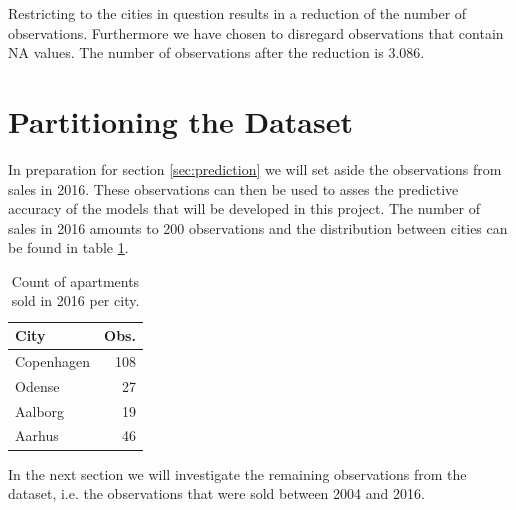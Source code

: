 Restricting to the cities in question results in a reduction of the number of observations.
Furthermore we have chosen to disregard observations that contain NA values.
The number of observations after the reduction is 3.086.

\section{Partitioning the Dataset}
In preparation for section \ref{sec:prediction} we will set aside the observations from sales in 2016.
These observations can then be used to asses the predictive accuracy of the models that will be developed in this project.
The number of sales in 2016 amounts to 200 observations and the distribution between cities can be found in table \ref{tbl:2016_obs_per_city}.
\begin{table}[H]
    \centering
    \begin{tabular}{lr}
        \toprule
        \textbf{City} & \textbf{Obs.}\\
        \midrule
        Copenhagen & 108\\
        Odense & 27\\
        Aalborg & 19\\
        Aarhus & 46\\
        \bottomrule
    \end{tabular}
    \caption{Count of apartments sold in 2016 per city.}
    \label{tbl:2016_obs_per_city}
\end{table}
In the next section we will investigate the remaining observations from the dataset, i.e. the observations that were sold between 2004 and 2016.

